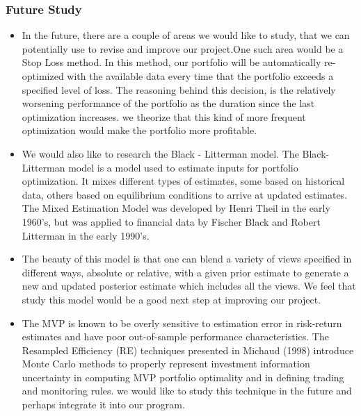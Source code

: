 \documentclass[12pt,titlepage,letter]{article}
\begin{document}
		\subsubsection{Future Study}
			\begin{itemize}
				\item In the future, there are a couple of areas we would like to study, that we can potentially use to revise and improve our project.One such area would be a Stop Loss method. In this method, our portfolio will be automatically re-optimized with the available data every time that the portfolio exceeds a specified level of loss. The reasoning behind this decision, is the relatively worsening performance of the portfolio as the duration since the last optimization increases. we theorize that this kind of more frequent optimization would make the portfolio more profitable.

				\item We would also like to research the Black - Litterman model. The Black-Litterman model is a model used to estimate inputs for portfolio optimization. It mixes different types of estimates, some based on historical data, others based on equilibrium conditions to arrive at updated estimates. The Mixed Estimation Model was developed by Henri Theil in the early 1960's, but was applied to financial data by Fischer Black and Robert Litterman in the early 1990's.
				
				\item The beauty of this model is that one can blend a variety of views specified in different ways, absolute or relative, with a given prior estimate to generate a new and updated posterior estimate which includes all the views.  We feel that study this model would be a good next step at improving our project.

				\item The MVP is known to be overly sensitive to estimation error in risk-return estimates and have poor out-of-sample performance characteristics. The Resampled Efficiency (RE) techniques presented in Michaud (1998) introduce Monte Carlo methods to properly represent investment information uncertainty in computing MVP portfolio optimality and in defining trading and monitoring rules.  we would like to study this technique in the future and perhaps integrate it into our program.
			\end{itemize}
\end{document}
